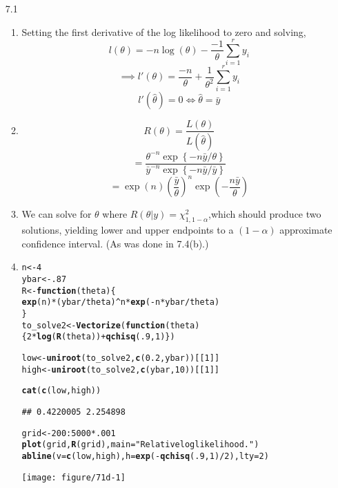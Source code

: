 \documentclass[12pt]{article}\usepackage[]{graphicx}\usepackage[]{color}
\makeatletter
\newcommand{\hlnum}[1]{\textcolor[rgb]{0.686,0.059,0.569}{#1}}%
\newcommand{\hlstr}[1]{\textcolor[rgb]{0.192,0.494,0.8}{#1}}%
\newcommand{\hlopt}[1]{\textcolor[rgb]{0,0,0}{#1}}%
\newcommand{\hlstd}[1]{\textcolor[rgb]{0.345,0.345,0.345}{#1}}%
\newcommand{\hlkwa}[1]{\textcolor[rgb]{0.161,0.373,0.58}{\textbf{#1}}}%
\newcommand{\hlkwb}[1]{\textcolor[rgb]{0.69,0.353,0.396}{#1}}%
\newcommand{\hlkwc}[1]{\textcolor[rgb]{0.333,0.667,0.333}{#1}}%
\newcommand{\hlkwd}[1]{\textcolor[rgb]{0.737,0.353,0.396}{\textbf{#1}}}%
\newenvironment{kframe}{%
 \def\at@end@of@kframe{}%
 \ifinner\ifhmode%
  \def\at@end@of@kframe{\end{minipage}}%
  \begin{minipage}{\columnwidth}%
 \fi\fi%
 \def\FrameCommand##1{\hskip\@totalleftmargin \hskip-\fboxsep
 \colorbox{shadecolor}{##1}\hskip-\fboxsep
     \hskip-\linewidth \hskip-\@totalleftmargin \hskip\columnwidth}%
 \MakeFramed {\advance\hsize-\width
   \@totalleftmargin\z@ \linewidth\hsize
   \@setminipage}}%
 {\par\unskip\endMakeFramed%
 \at@end@of@kframe}
\newenvironment{knitrout}{}{} %
\makeatother
\begin{document}
\begin{enumerate}
\item[7.1]
\begin{enumerate}
  \item
  Setting the first derivative of the log likelihood to zero and solving,
\[l(\theta) = -n \log(\theta) - \frac{-1}{\theta} \sum_{i=1}^r y_i\]
\[\implies l'(\theta) = \frac{-n}{\theta} +\frac{1}{\theta^2}\sum_{i=1}^r y_i\]
\[l'(\widehat{\theta}) = 0 \iff \widehat{\theta} = \bar{y}\]
  \item
  \[R(\theta) = \frac{L(\theta)}{L(\widehat{\theta})}\]
  \[=\frac{\theta^{-n}\exp\left\{-n\bar{y}/\theta\right\}}{
  \bar{y}^{-n}\exp\left\{-n\bar{y}/\bar{y}\right\}}\]
  \[=\exp(n)\left(\frac{\bar{y}}{\theta}\right)^n \exp\left(-\frac{n\bar{y}}{\theta}\right)\]
  \item
  We can solve for $\theta$ where $R(\theta|y) = \chi_{1,1-\alpha}^2$,which should produce two solutions, yielding lower and upper endpoints to a $(1-\alpha)$ approximate confidence interval. (As was done in 7.4(b).)
  
\item
\begin{knitrout}
\color{fgcolor}\begin{kframe}
\begin{alltt}
\hlstd{n} \hlkwb{<-} \hlnum{4}
\hlstd{ybar} \hlkwb{<-} \hlnum{.87}
\hlstd{R} \hlkwb{<-} \hlkwa{function}\hlstd{(}\hlkwc{theta}\hlstd{) \{}
  \hlkwd{exp}\hlstd{(n)} \hlopt{*} \hlstd{(ybar}\hlopt{/}\hlstd{theta)}\hlopt{^}\hlstd{n} \hlopt{*} \hlkwd{exp}\hlstd{(}\hlopt{-}\hlstd{n} \hlopt{*} \hlstd{ybar} \hlopt{/} \hlstd{theta)}
\hlstd{\}}
\hlstd{to_solve2} \hlkwb{<-} \hlkwd{Vectorize}\hlstd{(}\hlkwa{function}\hlstd{(}\hlkwc{theta}\hlstd{) \{}\hlnum{2} \hlopt{*} \hlkwd{log}\hlstd{(}\hlkwd{R}\hlstd{(theta))} \hlopt{+} \hlkwd{qchisq}\hlstd{(}\hlnum{.9}\hlstd{,}\hlnum{1}\hlstd{)\})}

\hlstd{low} \hlkwb{<-} \hlkwd{uniroot}\hlstd{(to_solve2,} \hlkwd{c}\hlstd{(}\hlnum{0.2}\hlstd{,ybar))[[}\hlnum{1}\hlstd{]]}
\hlstd{high} \hlkwb{<-} \hlkwd{uniroot}\hlstd{(to_solve2,} \hlkwd{c}\hlstd{(ybar,}\hlnum{10}\hlstd{))[[}\hlnum{1}\hlstd{]]}

\hlkwd{cat}\hlstd{(}\hlkwd{c}\hlstd{(low,high))}
\end{alltt}
\begin{verbatim}
## 0.4220005 2.254898
\end{verbatim}
\begin{alltt}
\hlstd{grid} \hlkwb{<-} \hlnum{200}\hlopt{:}\hlnum{5000} \hlopt{*} \hlnum{.001}
\hlkwd{plot}\hlstd{(grid,} \hlkwd{R}\hlstd{(grid),} \hlkwc{main}\hlstd{=}\hlstr{"Relative log likelihood."}\hlstd{)}
\hlkwd{abline}\hlstd{(}\hlkwc{v}\hlstd{=}\hlkwd{c}\hlstd{(low,high),}\hlkwc{h}\hlstd{=}\hlkwd{exp}\hlstd{(}\hlopt{-}\hlkwd{qchisq}\hlstd{(}\hlnum{.9}\hlstd{,}\hlnum{1}\hlstd{)}\hlopt{/}\hlnum{2}\hlstd{),}\hlkwc{lty}\hlstd{=}\hlnum{2}\hlstd{)}
\end{alltt}
\end{kframe}
\texttt{[image: figure/71d-1]} 


\end{knitrout}
\end{enumerate}
\end{enumerate}
\end{document}
